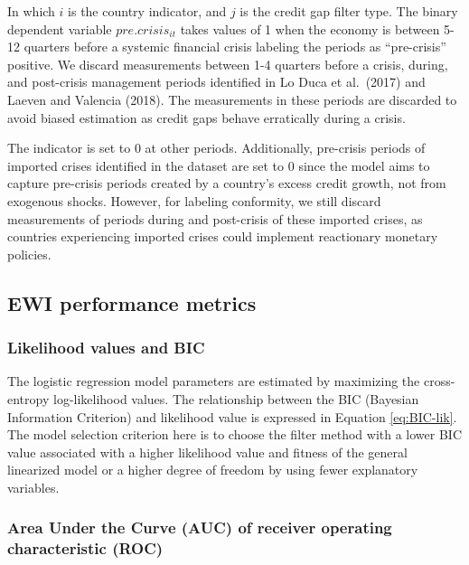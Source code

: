 \documentclass[
  12pt,
]{article}
\begin{document}
In which \(i\) is the country indicator, and \(j\) is the credit gap filter type. The binary dependent variable \(pre.crisis_{it}\) takes values of 1 when the economy is between 5-12 quarters before a systemic financial crisis labeling the periods as ``pre-crisis'' positive. We discard measurements between 1-4 quarters before a crisis, during, and post-crisis management periods identified in Lo Duca et al.~(2017) and Laeven and Valencia (2018). The measurements in these periods are discarded to avoid biased estimation as credit gaps behave erratically during a crisis.

The indicator is set to 0 at other periods. Additionally, pre-crisis periods of imported crises identified in the dataset are set to 0 since the model aims to capture pre-crisis periods created by a country's excess credit growth, not from exogenous shocks. However, for labeling conformity, we still discard measurements of periods during and post-crisis of these imported crises, as countries experiencing imported crises could implement reactionary monetary policies.

\hypertarget{metrics}{%
\subsection{EWI performance metrics}\label{metrics}}

\hypertarget{likelihood-values-and-bic}{%
\subsubsection{Likelihood values and BIC}\label{likelihood-values-and-bic}}

The logistic regression model parameters are estimated by maximizing the cross-entropy log-likelihood values. The relationship between the BIC (Bayesian Information Criterion) and likelihood value is expressed in Equation \eqref{eq:BIC-lik}. The model selection criterion here is to choose the filter method with a lower BIC value associated with a higher likelihood value and fitness of the general linearized model or a higher degree of freedom by using fewer explanatory variables.

\hypertarget{area-under-the-curve-auc-of-receiver-operating-characteristic-roc}{%
\subsubsection{Area Under the Curve (AUC) of receiver operating characteristic (ROC)}\label{area-under-the-curve-auc-of-receiver-operating-characteristic-roc}}
\end{document}
